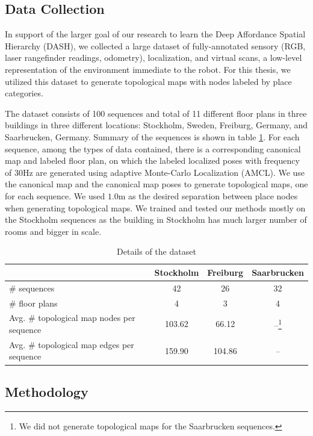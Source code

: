 \documentclass[11pt, titlepage]{article}
\theoremstyle{definition}
\begin{document}
\subsection{Data Collection}\label{section:data}

In support of the larger goal of our research to learn the Deep Affordance Spatial Hierarchy (DASH), we collected a large dataset of fully-annotated sensory (RGB, laser rangefinder readings, odometry), localization, and virtual scans, a low-level representation of the environment immediate to the robot. For this thesis, we utilized this dataset to generate topological maps with nodes labeled by place categories.

The dataset consists of 100 sequences and total of 11 different floor plans in three buildings in three different locations: Stockholm, Sweden, Freiburg, Germany, and Saarbrucken, Germany. Summary of the sequences is shown in table \ref{table:dataset}. For each sequence, among the types of data contained,  there is a corresponding canonical map and labeled floor plan, on which the labeled localized poses with frequency of 30Hz are generated using adaptive Monte-Carlo Localization (AMCL). We use the canonical map and the canonical map poses to generate topological maps, one for each sequence. We used $1.0$m as the desired separation between place nodes when generating topological maps. We trained and tested our methods mostly on the Stockholm sequences as the building in Stockholm has much larger number of rooms and bigger in scale.

\begin{table}[h!]
\centering
 \begin{tabular}{|l|c|c|c|} 
 \hline
  & Stockholm & Freiburg & Saarbrucken \\ [0.5ex] 
 \hline
 \# sequences & 42 & 26 & 32 \\ 
 \hline
 \# floor plans & 4 & 3 & 4 \\
 \hline
 Avg. \# topological map nodes per sequence & 103.62 & 66.12 & --\footnote{We did not generate topological maps for the Saarbrucken sequences.} \\
 \hline
 Avg. \# topological map edges per sequence & 159.90 & 104.86 & -- \\
 \hline
 \end{tabular}
 \caption{Details of the dataset}
 \label{table:dataset}
\end{table}

\subsection{Methodology}\label{section:method}
\end{document}
